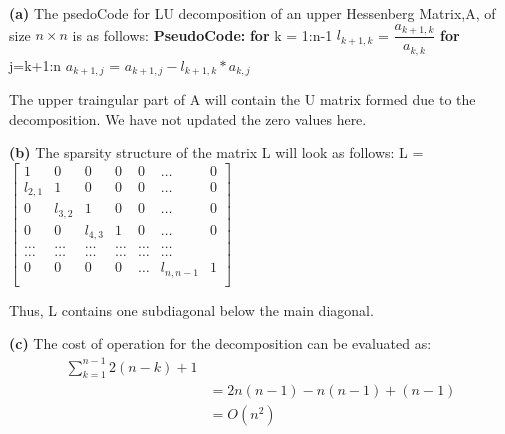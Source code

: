 \documentclass{article}
\renewcommand\part[1]{\vspace{.10in}\textbf{(#1)}}
\newcommand\pseudoCode{\vspace{.10in}\textbf{PseudoCode: }}
\begin{document}
\part{a}
The psedoCode for LU decomposition of an upper Hessenberg Matrix,A, of size $n \times n$ is as follows:\newline
\pseudoCode \newline
\hspace*{0.5cm} \textbf {for} k = 1:n-1 \newline
\hspace*{1cm}      $l_{k+1,k}$ = $\dfrac{a_{k+1,k}}{a_{k,k}}$ \newline
\hspace*{1cm}    \textbf {for} j=k+1:n \newline
\hspace*{1.5cm}     $ a_{k+1,j}$ = $a_{k+1,j} - l_{k+1,k}*a_{k,j}$ \newline

The upper traingular part of A will contain the U matrix formed due to the decomposition. We have not updated the zero values here. 

\part{b}
The sparsity structure of the matrix L will look as follows: \newline
L = $\begin{bmatrix} 
1 & 0 & 0 & 0 & 0 &\dots & 0 \\
l_{2,1} & 1 & 0 & 0 & 0 &\dots & 0 \\
0 & l_{3,2} & 1 & 0 & 0 & \dots & 0 \\
0 & 0 & l_{4,3} & 1 & 0 & \dots & 0 \\
\dots & \dots & \dots & \dots & \dots & \dots \\
\dots & \dots & \dots & \dots & \dots & \dots \\
0 & 0 & 0 & 0 & \dots &    l_{n,n-1} & 1 \\

\end{bmatrix}$

Thus, L contains one subdiagonal below the main diagonal. \newline

\part{c} 
The cost of operation for the decomposition  can be evaluated as: \newline
\begin{align*}
   \sum_{k=1}^{n-1} 2(n-k) + 1 \\
   &= 2n(n-1) -n(n-1) + (n-1) \\
   &= O(n^2) \\
\end{align*}
   
\end{document}
